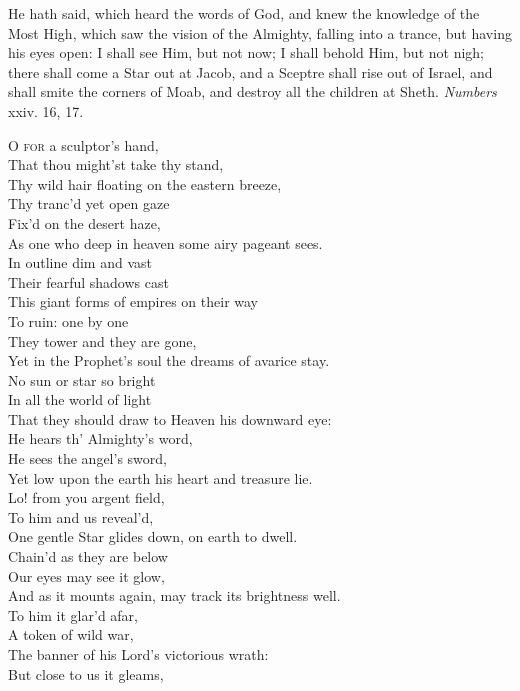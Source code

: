 He hath said, which heard the words of God, and knew the knowledge of the Most High, which saw the vision of the Almighty, falling into a trance, but having his eyes open: I shall see Him, but not now; I shall behold Him, but not nigh; there shall come a Star out at Jacob, and a Sceptre shall rise out of Israel, and shall smite the corners of Moab, and destroy all the children at Sheth. \emph{Numbers} xxiv. 16, 17.

\textsc{O for} a sculptor’s hand, \\
 That thou might’st take thy stand, \\
 Thy wild hair floating on the eastern breeze, \\
 Thy tranc’d yet open gaze \\
 Fix’d on the desert haze, \\
 As one who deep in heaven some airy pageant sees. \\
  In outline dim and vast \\
 Their fearful shadows cast \\
 This giant forms of empires on their way \\
 To ruin: one by one \\
 They tower and they are gone, \\
 Yet in the Prophet’s soul the dreams of avarice stay. \\
  No sun or star so bright \\
 In all the world of light \\
 That they should draw to Heaven his downward eye: \\
 He hears th’ Almighty’s word, \\
 He sees the angel’s sword, \\
 Yet low upon the earth his heart and treasure lie. \\
  Lo! from you argent field, \\
 To him and us reveal’d, \\
 One gentle Star glides down, on earth to dwell. \\
 Chain’d as they are below \\
 Our eyes may see it glow, \\
 And as it mounts again, may track its brightness well. \\
  To him it glar’d afar, \\
 A token of wild war, \\
 The banner of his Lord’s victorious wrath: \\
 But close to us it gleams, \\
